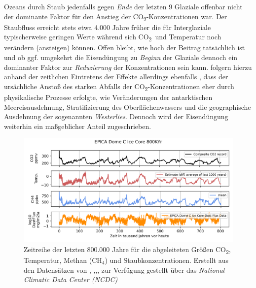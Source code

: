 \documentclass[12pt,a4paper,onecolumn]{scrartcl}
\newcommand{\cotwo}{CO\textsubscript{2}}
\begin{document}
Ozeans durch Staub jedenfalls gegen \textit{Ende} der letzten 9 Glaziale offenbar nicht der dominante Faktor für den Anstieg der \cotwo -Konzentrationen war. Der Staubfluss erreicht stets etwa 4.000 Jahre früher die für Interglaziale typischerweise  geringen Werte während sich \cotwo \ und Temperatur noch verändern (ansteigen) können. Offen bleibt, wie hoch der Beitrag tatsächlich ist und ob ggf. umgekehrt die Eisendüngung zu \textit{Beginn} der Glaziale dennoch ein dominanter Faktor zur \textit{Reduzierung} der Konzentrationen sein kann. \citet{MartinezGarcia.2009} folgern hierzu anhand der zeitlichen Eintretens der Effekte allerdings ebenfalls , dass der ursächliche Anstoß des starken Abfalls der \cotwo -Konzentrationen eher durch physikalische Prozesse erfolgte, wie Veränderungen der antarktischen Meereisausdehnung, Stratifizierung des Oberflächenwassers und die geographische Ausdehnung der sogenannten \textit{Westerlies}. Dennoch wird der Eisendüngung weiterhin ein maßgeblicher Anteil zugeschrieben.

\begin{figure}[ht]
\centering
\includegraphics[width=\textwidth]{bilder/epica_icecore.png}
\caption{ Zeitreihe der letzten 800.000 Jahre für die abgeleiteten Größen \cotwo, Temperatur, Methan (CH$_4$) und Staubkonzentrationen. Erstellt aus den Datensätzen von \cite{Jouzel.2007}, \cite{Lambert.2012},\cite{Loulergue.2008},\cite{Bereiter.2015}, zur Verfügung gestellt über das \textit{National Climatic Data Center (NCDC) }  }   \label{fig:icecore}
\end{figure}
\end{document}
